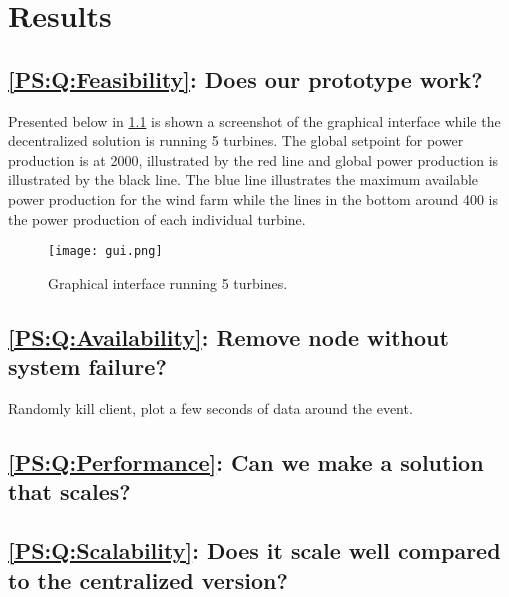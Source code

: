 
\chapter{Results}

\section{\ref{PS:Q:Feasibility}: Does our prototype work?}
Presented below in \cref{fig:graphicalInterface} is shown a screenshot of the graphical interface while the decentralized solution is running 5 turbines. The global setpoint for power production is at 2000, illustrated by the red line and global power production is illustrated by the black line. The blue line illustrates the maximum available power production for the wind farm while the lines in the bottom around 400 is the power production of each individual turbine.

\begin{figure} [!h]
	\centering
	\texttt{[image: gui.png]} 
	\caption[Graphical interface running 5 turbines]{
		\label{fig:graphicalInterface} 
		\footnotesize{%
			Graphical interface running 5 turbines.
		}
	}
\end{figure}


\section{\ref{PS:Q:Availability}: Remove node without system failure?}
Randomly kill client, plot a few seconds of data around the event.

\section{\ref{PS:Q:Performance}: Can we make a solution that scales?}




\section{\ref{PS:Q:Scalability}: Does it scale well compared to the centralized version?}



